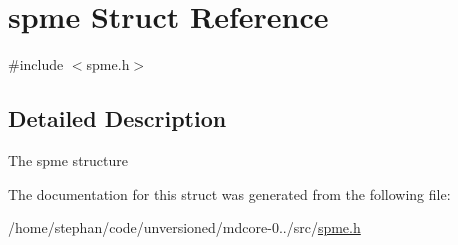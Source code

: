 \hypertarget{structspme}{\section{spme Struct Reference}
\label{structspme}
}


{\ttfamily \#include $<$spme.\-h$>$}



\subsection{Detailed Description}
The spme structure 

The documentation for this struct was generated from the following file\-:\begin{DoxyCompactItemize}
\item 
/home/stephan/code/unversioned/mdcore-\/0../src/\hyperlink{spme_8h}{spme.\-h}\end{DoxyCompactItemize}
